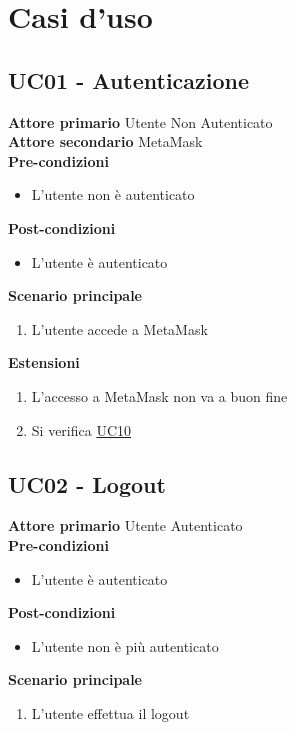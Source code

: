 \section{Casi d'uso}

\subsection{UC01 - Autenticazione}
\textbf{Attore primario} Utente Non Autenticato \\
\textbf{Attore secondario} MetaMask \\
\textbf{Pre-condizioni}
\begin{itemize}
    \item L'utente non è autenticato
\end{itemize}
\textbf{Post-condizioni}
\begin{itemize}
    \item L'utente è autenticato
\end{itemize}
\textbf{Scenario principale}
\begin{enumerate}
    \item L'utente accede a MetaMask
\end{enumerate}
\textbf{Estensioni}
\begin{enumerate}
    \item L'accesso a MetaMask non va a buon fine
    \item Si verifica \hyperref[UC10]{UC10}
\end{enumerate}

\subsection{UC02 - Logout}
\textbf{Attore primario} Utente Autenticato \\
\textbf{Pre-condizioni}
\begin{itemize}
    \item L'utente è autenticato
\end{itemize}
\textbf{Post-condizioni}
\begin{itemize}
    \item L'utente non è più autenticato
\end{itemize}
\textbf{Scenario principale}
\begin{enumerate}
    \item L'utente effettua il logout
\end{enumerate}


